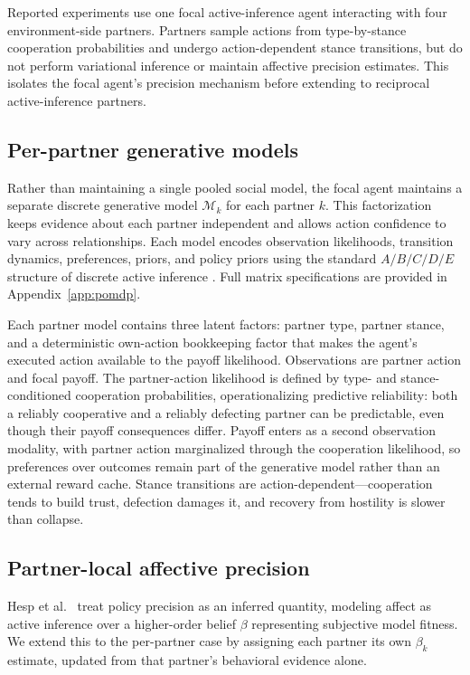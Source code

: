 Reported experiments use one focal active-inference agent interacting with four environment-side partners. Partners sample actions from type-by-stance cooperation probabilities and undergo action-dependent stance transitions, but do not perform variational inference or maintain affective precision estimates. This isolates the focal agent's precision mechanism before extending to reciprocal active-inference partners.

\subsection{Per-partner generative models}

Rather than maintaining a single pooled social model, the focal agent maintains a separate discrete generative model $\mathcal{M}_k$ for each partner $k$. This factorization keeps evidence about each partner independent and allows action confidence to vary across relationships. Each model encodes observation likelihoods, transition dynamics, preferences, priors, and policy priors using the standard $A/B/C/D/E$ structure of discrete active inference \cite{DaCosta2020DiscreteSynthesis}. Full matrix specifications are provided in Appendix~\ref{app:pomdp}.

Each partner model contains three latent factors: partner type, partner stance, and a deterministic own-action bookkeeping factor that makes the agent's executed action available to the payoff likelihood. Observations are partner action and focal payoff. The partner-action likelihood is defined by type- and stance-conditioned cooperation probabilities, operationalizing predictive reliability: both a reliably cooperative and a reliably defecting partner can be predictable, even though their payoff consequences differ. Payoff enters as a second observation modality, with partner action marginalized through the cooperation likelihood, so preferences over outcomes remain part of the generative model rather than an external reward cache. Stance transitions are action-dependent---cooperation tends to build trust, defection damages it, and recovery from hostility is slower than collapse.

\subsection{Partner-local affective precision}

Hesp et al.\ \cite{Hesp2021DeeplyFeltAffect} treat policy precision as an inferred quantity, modeling affect as active inference over a higher-order belief $\beta$ representing subjective model fitness. We extend this to the per-partner case by assigning each partner its own $\beta_k$ estimate, updated from that partner's behavioral evidence alone.

